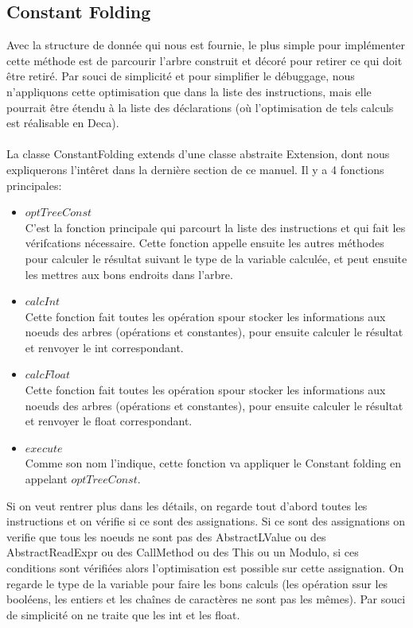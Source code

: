 \documentclass[a4paper]{article}
\begin{document}
\subsection{Constant Folding}
Avec la structure de donnée qui nous est fournie, le plus simple pour implémenter cette méthode est de parcourir l'arbre construit et décoré pour retirer ce qui doit être retiré. Par souci de simplicité et pour simplifier le débuggage, nous n'appliquons cette optimisation que dans la liste des instructions, mais elle pourrait être étendu à la liste des déclarations (où l'optimisation de tels calculs est réalisable en Deca).\\ \\
La classe ConstantFolding extends d'une classe abstraite Extension, dont nous expliquerons l'intêret dans la dernière section de ce manuel. Il y a 4 fonctions principales:
\begin{itemize}
\item \texttt{$optTreeConst$} \\
C'est la fonction principale qui parcourt la liste des instructions et qui fait les vérifcations nécessaire. Cette fonction appelle ensuite les autres méthodes pour calculer le résultat suivant le type de la variable calculée, et peut ensuite les mettres aux bons endroits dans l'arbre.\\
\item \texttt{$calcInt$} \\
Cette fonction fait toutes les opération spour stocker les informations aux noeuds des arbres (opérations et constantes), pour ensuite calculer le résultat et renvoyer le int correspondant.\\
\item \texttt{$calcFloat$} \\
Cette fonction fait toutes les opération spour stocker les informations aux noeuds des arbres (opérations et constantes), pour ensuite calculer le résultat et renvoyer le float correspondant.\\
\item \texttt{$execute$}\\
Comme son nom l'indique, cette fonction va appliquer le Constant folding en appelant $optTreeConst$.\\
 \end{itemize}
Si on veut rentrer plus dans les détails, on regarde tout d'abord toutes les instructions et on vérifie si ce sont des assignations. Si ce sont des assignations on verifie que tous les noeuds ne sont pas des AbstractLValue ou des AbstractReadExpr ou des CallMethod ou des This ou un Modulo, si ces conditions sont vérifiées alors l'optimisation est possible sur cette assignation. On regarde le type de la variable pour faire les bons calculs (les opération ssur les booléens, les entiers et les chaînes de caractères ne sont pas les mêmes). Par souci de simplicité on ne traite que les int et les float.\\ \\
\end{document}

